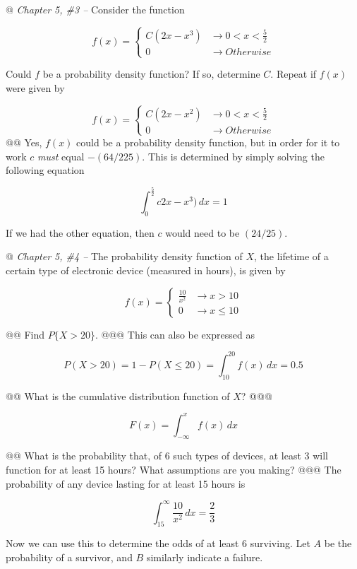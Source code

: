 \documentclass[10pt]{article}
\begin{document}
\begin{easylist}[enumerate]
    @ \textit{Chapter 5, \#3 --} Consider the function

    \[
        f(x) =
        \begin{cases}
            C(2x - x^3) &\to 0 < x < \frac{5}{2}\\
            0 &\to Otherwise
        \end{cases}
    \]

    Could $f$ be a probability density function? If so, determine $C$. Repeat if $f(x)$ were given by

    \[
        f(x) =
        \begin{cases}
            C(2x - x^2) &\to 0 < x < \frac{5}{2}\\
            0 &\to Otherwise
        \end{cases}
    \]
    @@ Yes, $f(x)$ could be a probability density function, but in order for it to work $c$ \textit{must} equal
    $-(64/225)$. This is determined by simply solving the following equation

    \[
        \int^\frac{5}{2}_0 c 2x - x^3) \, dx = 1
    \]

    If we had the other equation, then $c$ would need to be $(24/25)$.

    @ \textit{Chapter 5, \#4 --} The probability density function of $X$, the lifetime of a certain type of electronic
    device (measured in hours), is given by

    \[
        f(x) =
        \begin{cases}
            \frac{10}{x^2} &\to x > 10\\
            0 &\to x \le 10
        \end{cases}
    \]

    @@ Find $P\{X > 20\}$.
    @@@ This can also be expressed as

    \[ P(X > 20) = 1 - P(X \le 20) = \int^{20}_{10} f(x) \, dx = \boxed{0.5} \]

    @@ What is the cumulative distribution function of $X$?
    @@@

    \[
        F(x) = \int^x_{-\infty} f(x) \, dx
    \]

    @@ What is the probability that, of 6 such types of devices, at least 3 will function for at least 15 hours? What
    assumptions are you making?
    @@@ The probability of any device lasting for at least 15 hours is

    \[ \int^\infty_15 \frac{10}{x^2} \, dx = \frac{2}{3} \]

    Now we can use this to determine the odds of at least 6 surviving. Let $A$ be the probability of a survivor, and $B$
    similarly indicate a failure.


\end{easylist}
\end{document}
